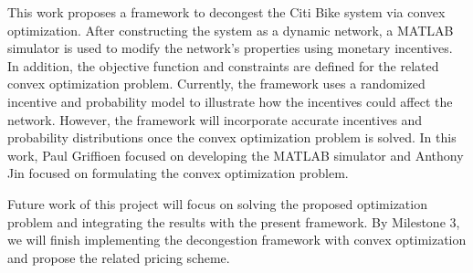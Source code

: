 \documentclass[times, 10pt,twocolumn]{article}
\begin{document}



This work proposes a framework to decongest the Citi Bike system via convex optimization. After constructing the system as a dynamic network, a MATLAB simulator is used to modify the network's properties using monetary incentives. In addition, the objective function and constraints are defined for the related convex optimization problem. Currently, the framework uses a randomized incentive and probability model to illustrate how the incentives could affect the network. However, the framework will incorporate accurate incentives and probability distributions once the convex optimization problem is solved. In this work, Paul Griffioen focused on developing the MATLAB simulator and Anthony Jin focused on formulating the convex optimization problem.

Future work of this project will focus on solving the proposed optimization problem and integrating the results with the present framework. By Milestone 3, we will finish implementing the decongestion framework with convex optimization and propose the related pricing scheme.

\end{document}
